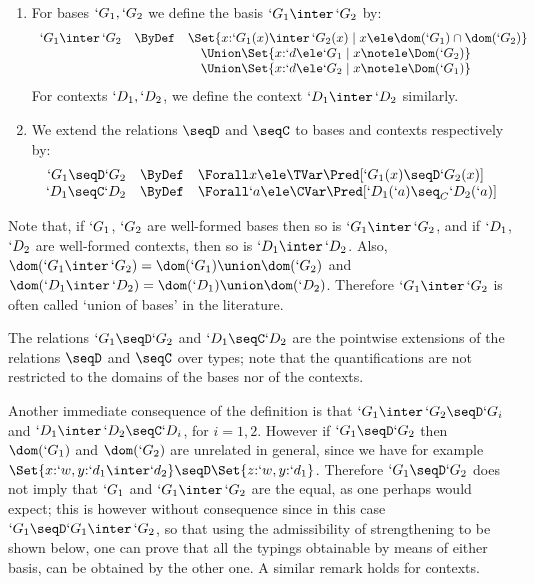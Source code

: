 \documentclass{CSML}
\begin{document}
 \begin{defi} \label{def:ext-leq}\hfill
 \begin{enumerate}
 \item \label{def:ext-leq-ii}
For bases $`G_1, `G_2$ we define the basis $`G_1\inter\,`G_2$ by:
%
 \[ \begin{array}{rcl}
`G_1\inter\,`G_2 &\ByDef& 
	\Set{x{:}`G_1(x)\inter\, `G_2(x) \mid x \ele \dom(`G_1) \cap \dom(`G_2) } \\ %
	&& \quad \Union \Set {x{:}`d \ele `G_1 \mid x \notele \Dom(`G_2) } \\ %
	&& \quad \Union \Set {x{:}`d \ele `G_2 \mid x \notele \Dom(`G_1) }
 \end{array} \]
For contexts $`D_1,`D _2$, we define the context $`D_1\inter\,`D _2$ similarly.
 
 \item \label{def:ext-leq-iii}
We extend the relations $\seqD$ and $\seqC$ to bases and contexts respectively by:
%
 \[ \begin{array}[t]{rcl}
`G_1 \seqD `G_2 & \ByDef & 
	\Forall x\ele \TVar \Pred[ `G_1(x) \seqD `G_2(x) ]
	\\ %
`D_1 \seqC `D_2& \ByDef & 
	 \Forall `a\ele \CVar \Pred[ `D_1(`a) \seq_C `D_2(`a) ]
 \end{array} \]

 \end{enumerate}
 \end{defi}

\noindent Note that, if $`G_1$, $`G_2$ are well-formed bases then so is $`G_1\inter\,`G_2$, and if $`D_1$, $`D _2$ are well-formed contexts, then so is $`D_1\inter\,`D _2$. 
Also, $\dom(`G_1\inter\,`G_2) = \dom(`G_1) \union \dom(`G_2)$ and
$\dom(`D_1\inter\,`D _2) = \dom(`D_1) \union \dom(`D_2)$. 
Therefore $`G_1\inter\,`G_2$ is often called `union of bases' in the literature.

The relations $`G_1 \seqD `G_2$ and $`D_1 \seqC `D_2$ are the pointwise extensions of the relations $\seqD$ and $\seqC$ over types; note that the quantifications are not restricted to the domains of the bases nor of the contexts.

Another immediate consequence of the definition is that $`G_1 \inter\,`G_2 \seqD `G_i$ and $`D_1 \inter\,`D _2 \seqC `D_i$, for $i = 1,2$. 
However if $`G_1 \seqD `G_2$ then $\dom(`G_1)$ and $\dom(`G_2)$ are unrelated in general, since we have for example $\Set{x{:}`w,y{:}`d_1\inter`d_2} \seqD \Set{z{:}`w,y{:}`d_1}$. 
Therefore $`G_1 \seqD `G_2$ does not imply that $`G_1$ and $`G_1 \inter\,`G_2$ are the equal, as one perhaps would expect; this is however without consequence since in this case $`G_1 \seqD `G_1 \inter\,`G_2$, so that using the admissibility of strengthening to be shown below, one can prove that all the typings obtainable by means of either basis, can be obtained by the other one.
A similar remark holds for contexts.
\end{document}
